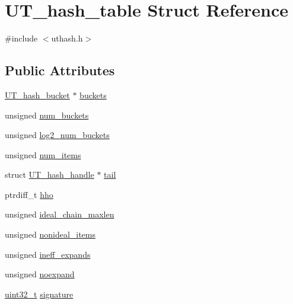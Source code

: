 \hypertarget{struct_u_t__hash__table}{\section{U\-T\-\_\-hash\-\_\-table Struct Reference}
\label{struct_u_t__hash__table}
}


{\ttfamily \#include $<$uthash.\-h$>$}

\subsection*{Public Attributes}
\begin{DoxyCompactItemize}
\item 
\hyperlink{struct_u_t__hash__bucket}{U\-T\-\_\-hash\-\_\-bucket} $\ast$ \hyperlink{struct_u_t__hash__table_a8df0d350ea7376c8a844ae4c58509056}{buckets}
\item 
unsigned \hyperlink{struct_u_t__hash__table_a3ed04b6233facaedf910672578d86339}{num\-\_\-buckets}
\item 
unsigned \hyperlink{struct_u_t__hash__table_ae376a7f3fac525f3a9d03b6beec8d12f}{log2\-\_\-num\-\_\-buckets}
\item 
unsigned \hyperlink{struct_u_t__hash__table_a74534cc14f080c96f94d8f5da83d9d76}{num\-\_\-items}
\item 
struct \hyperlink{struct_u_t__hash__handle}{U\-T\-\_\-hash\-\_\-handle} $\ast$ \hyperlink{struct_u_t__hash__table_a00c43ffe6c1545c3f1729acbd7b0ef83}{tail}
\item 
ptrdiff\-\_\-t \hyperlink{struct_u_t__hash__table_afd05f4d9e45354fb010367ae9e1bddb6}{hho}
\item 
unsigned \hyperlink{struct_u_t__hash__table_a5f1cec93d5d753ba02097c797e4d67ad}{ideal\-\_\-chain\-\_\-maxlen}
\item 
unsigned \hyperlink{struct_u_t__hash__table_a8cb66cfb259a204cda59a815e4db664f}{nonideal\-\_\-items}
\item 
unsigned \hyperlink{struct_u_t__hash__table_a216c7d98cf40a0064bee94aa8a5bf1b7}{ineff\-\_\-expands}
\item 
unsigned \hyperlink{struct_u_t__hash__table_a635661789933752e7b83dac84430eae1}{noexpand}
\item 
\hyperlink{msus_2webserver_2uthash_8h_a435d1572bf3f880d55459d9805097f62}{uint32\-\_\-t} \hyperlink{struct_u_t__hash__table_a87d1ab3f3ede1809c6a485972d20b25f}{signature}
\end{DoxyCompactItemize}


